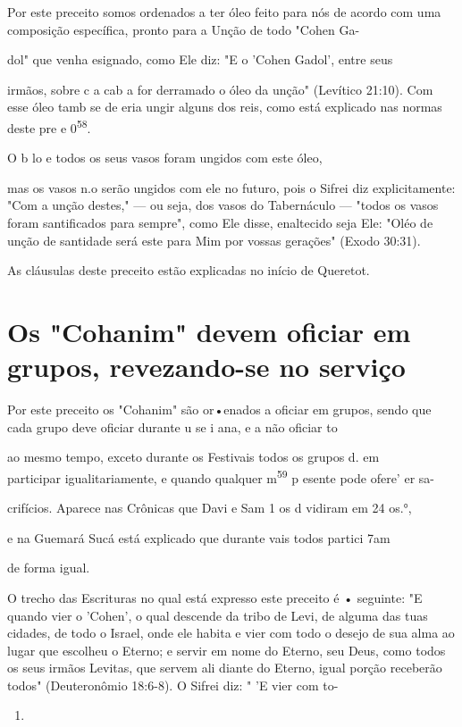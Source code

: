 \begin{itemize}
\begin{enumrate}
\begin{itemize}
\begin{itemize}
Por este preceito somos ordenados a ter óleo feito para nós de acor­do
com uma composição específica, pronto para a Unção de todo "Cohen Ga-

dol" que venha esignado, como Ele diz: "E o 'Cohen Gadol', entre seus

irmãos, sobre c a cab a for derramado o óleo da unção" (Levítico 21:10).
Com esse óleo tamb se de eria ungir alguns dos reis, como está explicado
nas nor­mas deste pre e 0\textsuperscript{58}.

O b lo e todos os seus vasos foram ungidos com este óleo,

mas os vasos n.o serão ungidos com ele no futuro, pois
o Sifrei diz explicita­mente: "Com a unção destes," --- ou seja, dos
vasos do Tabernáculo --- "todos os vasos foram santificados para
sempre", como Ele disse, enaltecido seja Ele: "Oléo de unção de
santidade será este para Mim por vossas gerações" (Exodo 30:31).


As cláusulas deste preceito estão explicadas no início de Queretot.


\section{Os "Cohanim" devem oficiar em grupos, revezando-se no serviço}

Por este preceito os "Cohanim" são or•enados a oficiar em grupos, sendo
que cada grupo deve oficiar durante u se i ana, e a não oficiar to

ao mesmo tempo, exceto durante os Festivais todos os grupos d. em\\
participar igualitariamente, e quando qualquer m\textsuperscript{59} p
esente pode ofere' er sa-

crifícios. Aparece nas Crônicas que Davi e Sam 1 os d vidiram em 24
os.°,

e na Guemará Sucá está explicado que durante vais todos partici 7am

de forma igual.

O trecho das Escrituras no qual está expresso este preceito é •
se­guinte: "E quando vier o 'Cohen', o qual descende da tribo de Levi,
de alguma das tuas cidades, de todo o Israel, onde ele habita e vier com
todo o desejo de sua alma ao lugar que escolheu o Eterno; e servir em
nome do Eterno, seu Deus, como todos os seus irmãos Levitas, que servem
ali diante do Eterno, igual porção receberão todos" (Deuteronômio
18:6-8). O Sifrei diz: " 'E vier com to-


\begin{enumerate}
\def\labelenumi{\arabic{enumi}.}
\setcounter{enumi}{57}
\item
 

\end{enumerate}
\end{itemize}
\end{itemize}
\end{enumrate}
\end{itemize}
